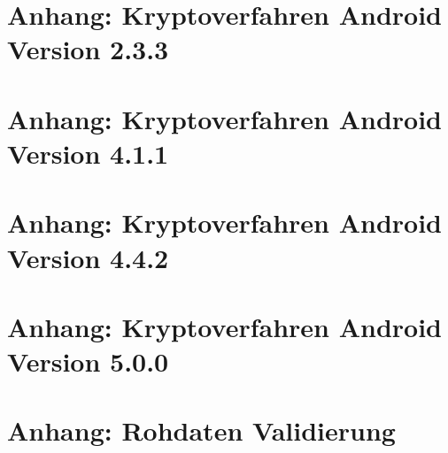 \documentclass[10pt, a4paper,headsepline]{scrreprt}
\begin{document}






\chapter{Anhang: Kryptoverfahren Android Version 2.3.3}


\chapter{Anhang: Kryptoverfahren Android Version 4.1.1}


\chapter{Anhang: Kryptoverfahren Android Version 4.4.2}


\chapter{Anhang: Kryptoverfahren Android Version 5.0.0}


\chapter{Anhang: Rohdaten Validierung}




\end{document}
